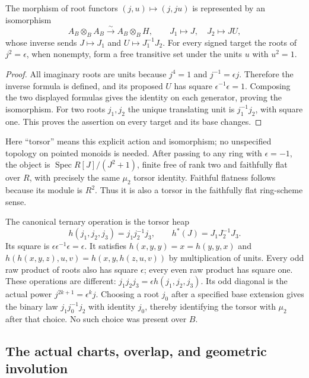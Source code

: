 \begin{theorem}
\label{at:thm:torsor}
The morphism of root functors
$(j,u)\mapsto(j,ju)$ is represented by an isomorphism
\[
 A_B\otimes_BA_B\xrightarrow{\sim}A_B\otimes_BH,
 \qquad J_1\mapsto J,\quad J_2\mapsto JU,
 \tag{AT13}\label{at:eq:torsor-identity}
\]
whose inverse sends $J\mapsto J_1$ and
$U\mapsto J_1^{-1}J_2$. For every signed target the roots of
$j^2=\epsilon$, when nonempty, form a free transitive set under
the units $u$ with $u^2=1$.
\end{theorem}
\begin{proof}
All imaginary roots are units because $j^4=1$ and
$j^{-1}=\epsilon j$. Therefore the inverse formula is defined,
and its proposed $U$ has square $\epsilon^{-1}\epsilon=1$.
Composing the two displayed formulas gives the identity on each
generator, proving the isomorphism. For two roots $j_1,j_2$ the
unique translating unit is $j_1^{-1}j_2$, with square one.
This proves the assertion on every target and its base changes.
\end{proof}

Here ``torsor'' means this explicit action and isomorphism;
no unspecified topology on pointed monoids is needed. After
passing to any ring with $\epsilon=-1$, the object is
$\operatorname{Spec}R[J]/(J^2+1)$, finite free of rank two and
faithfully flat over $R$, with precisely the same $\mu_2$ torsor
identity. Faithful flatness follows because its module is $R^2$.
Thus it is also a torsor in the faithfully flat ring-scheme sense.

The canonical ternary operation is the torsor heap
\[
 h(j_1,j_2,j_3)=j_1j_2^{-1}j_3,
 \qquad h^*(J)=J_1J_2^{-1}J_3.
 \tag{AT14}\label{at:eq:heap}
\]
Its square is $\epsilon\epsilon^{-1}\epsilon=\epsilon$.
It satisfies $h(x,y,y)=x=h(y,y,x)$ and
$h(h(x,y,z),u,v)=h(x,y,h(z,u,v))$ by multiplication of units.
Every odd raw product of roots also has square $\epsilon$;
every even raw product has square one. These operations are
different: $j_1j_2j_3=\epsilon h(j_1,j_2,j_3)$. Its odd
diagonal is the actual power $j^{2k+1}=\epsilon^kj$.
Choosing a root $j_0$ after a specified base extension gives
the binary law $j_1j_0^{-1}j_2$ with identity $j_0$, thereby
identifying the torsor with $\mu_2$ after that choice. No such
choice was present over $B$.

\subsection{The actual charts, overlap, and geometric involution}

